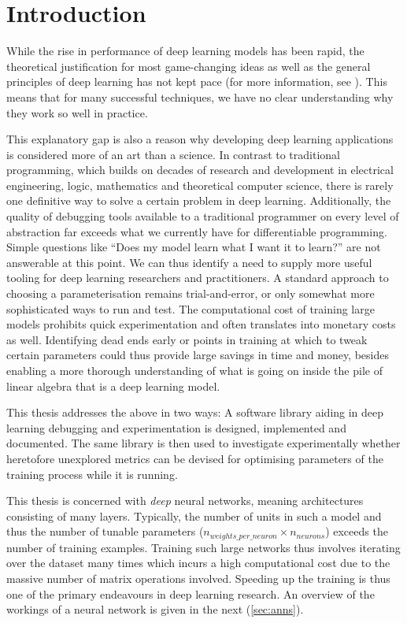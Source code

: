 \chapter{Introduction}\label{sec:introduction}

While the rise in performance of deep learning models has been rapid, the theoretical
justification for most game-changing ideas as well as the general principles of
deep learning has not kept pace (for more information, see \cite{arora2018}).
This means that for many successful techniques, we have no clear understanding
why they work so well in practice.

This explanatory gap is also a reason why developing deep learning applications
is considered more of an art than a science. In contrast to traditional
programming, which builds on decades of research and development in electrical
engineering, logic, mathematics and theoretical computer science, there is rarely
one definitive way to solve a certain problem in deep learning.  Additionally,
the quality of debugging tools available to a traditional programmer on every level of
abstraction far exceeds what we currently have for differentiable programming.
Simple questions like ``Does my model learn what I want it to learn?'' are not
answerable at this point.  We can thus identify a need to supply more useful
tooling for deep learning researchers and practitioners.  A standard approach to
choosing a parameterisation remains trial-and-error, or only somewhat more
sophisticated ways to run and test.  The computational cost of training large
models prohibits quick experimentation and often translates into monetary costs
as well.  Identifying dead ends early or points in training at which to tweak
certain parameters could thus provide large savings in time and money, besides
enabling a more thorough understanding of what is going on inside the pile of
linear algebra that is a deep learning model.

This thesis addresses the above in two ways: A software library aiding in deep
learning debugging and experimentation is designed, implemented and documented. The same
library is then used to investigate experimentally whether heretofore unexplored
metrics can be devised for optimising parameters of the training process while it is running.

This thesis is concerned with \emph{deep} neural networks, meaning
architectures consisting of many layers. Typically, the number of units
in such a model and thus the number of tunable parameters
(\(n_{weights\_per\_neuron} \times n_{neurons}\)) exceeds the number of
training examples. Training such large networks thus involves iterating
over the dataset many times which incurs a high computational cost due
to the massive number of matrix operations involved. Speeding up the
training is thus one of the primary endeavours in deep learning
research. An overview of the workings of a neural network is given in
the next (\cref{sec:anns}).


